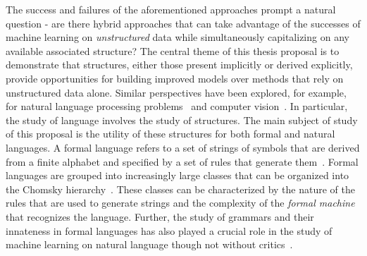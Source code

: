 %
The success and failures of the aforementioned approaches prompt a natural question - are there hybrid approaches that can take advantage of the successes of machine learning on \textit{unstructured} data while simultaneously capitalizing on any available associated structure?
The central theme of this thesis proposal is to demonstrate that structures, either those present implicitly or derived explicitly, provide opportunities for building improved models over methods that rely on unstructured data alone.
Similar perspectives have been explored, for example, for natural language processing problems~\citep{wu2021graph} and computer vision~\citep{johnson2018image}.
In particular, the study of language involves the study of structures. 
The main subject of study of this proposal is the utility of these structures for both formal and natural languages.
A formal language refers to a set of strings of symbols that are derived from a finite alphabet and specified by a set of rules that generate them~\citep{scott2000programming}.
Formal languages are grouped into increasingly large classes that can be organized into the Chomsky hierarchy~\citep{chomsky1956three}.
These classes can be characterized by the nature of the rules that are used to generate strings and the complexity of the \textit{formal machine} that recognizes the language.
Further, the study of grammars and their innateness in formal languages has also played a crucial role in the study of machine learning on natural language%
though not without critics~\citep{pullum2002empirical,linzen2021syntactic}.

